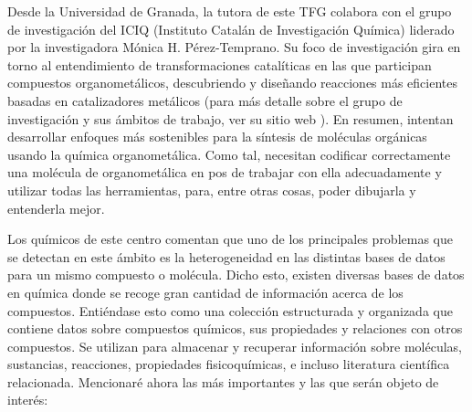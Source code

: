 Desde la Universidad de Granada, la tutora de este TFG colabora con el grupo de investigación del ICIQ (Instituto Catalán de Investigación Química) liderado por la investigadora Mónica H. Pérez-Temprano. Su foco de investigación gira en torno al entendimiento de transformaciones catalíticas en las que participan compuestos organometálicos, descubriendo y diseñando reacciones más eficientes basadas en catalizadores metálicos (para más detalle sobre el grupo de investigación y sus ámbitos de trabajo, ver su sitio web \cite{ICIQ}). En resumen, intentan desarrollar enfoques más sostenibles para la síntesis de moléculas orgánicas usando la química organometálica. Como tal, necesitan codificar correctamente una molécula de organometálica en pos de trabajar con ella adecuadamente y utilizar todas las herramientas, para, entre otras cosas, poder dibujarla y entenderla mejor.

Los químicos de este centro comentan que uno de los principales problemas que se detectan en este ámbito es la heterogeneidad en las distintas bases de datos para un mismo compuesto o molécula. Dicho esto, existen diversas bases de datos en química donde se recoge gran cantidad de información acerca de los compuestos. Entiéndase esto como una colección estructurada y organizada que contiene datos sobre compuestos químicos, sus propiedades y relaciones con otros compuestos. Se utilizan para almacenar y recuperar información sobre moléculas, sustancias, reacciones, propiedades fisicoquímicas, e incluso literatura científica relacionada. Mencionaré ahora las más importantes y las que serán objeto de interés:

